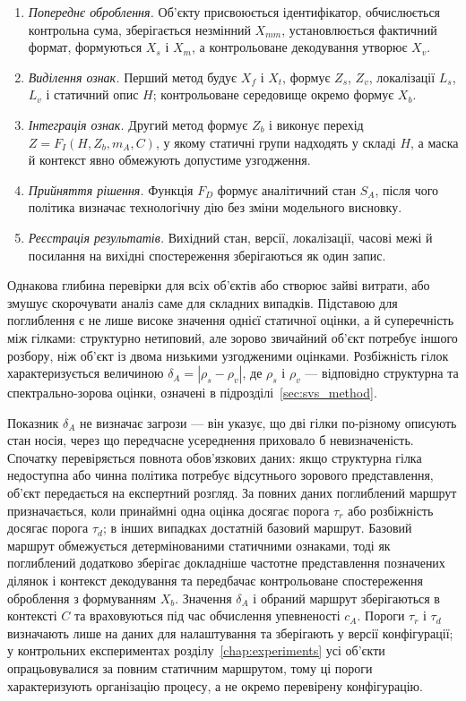 \begin{enumerate}
\item \textit{Попереднє оброблення.} Об’єкту присвоюється ідентифікатор, обчислюється контрольна сума, зберігається незмінний $X_{mm}$, установлюється фактичний формат, формуються $X_s$ і $X_m$, а контрольоване декодування утворює $X_v$.
\item \textit{Виділення ознак.} Перший метод будує $X_f$ і $X_t$, формує $Z_s$, $Z_v$, локалізації $L_s$, $L_v$ і статичний опис $H$; контрольоване середовище окремо формує $X_b$.
\item \textit{Інтеграція ознак.} Другий метод формує $Z_b$ і виконує перехід $Z=F_I(H,Z_b,m_A,C)$, у якому статичні групи надходять у складі $H$, а маска й контекст явно обмежують допустиме узгодження.
\item \textit{Прийняття рішення.} Функція $F_D$ формує аналітичний стан $S_A$, після чого політика визначає технологічну дію без зміни модельного висновку.
\item \textit{Реєстрація результатів.} Вихідний стан, версії, локалізації, часові межі й посилання на вихідні спостереження зберігаються як один запис.
\end{enumerate}

Однакова глибина перевірки для всіх об’єктів або створює зайві витрати, або змушує скорочувати аналіз саме для складних випадків. Підставою для поглиблення є не лише високе значення однієї статичної оцінки, а й суперечність між гілками: структурно нетиповий, але зорово звичайний об’єкт потребує іншого розбору, ніж об’єкт із двома низькими узгодженими оцінками. Розбіжність гілок характеризується величиною $\delta_A=|\rho_s-\rho_v|$, де $\rho_s$ і $\rho_v$ --- відповідно структурна та спектрально-зорова оцінки, означені в підрозділі~\ref{sec:svs_method}.

Показник $\delta_A$ не визначає загрози --- він указує, що дві гілки по-різному описують стан носія, через що передчасне усереднення приховало б невизначеність. Спочатку перевіряється повнота обов’язкових даних: якщо структурна гілка недоступна або чинна політика потребує відсутнього зорового представлення, об’єкт передається на експертний розгляд. За повних даних поглиблений маршрут призначається, коли принаймні одна оцінка досягає порога $\tau_r$ або розбіжність досягає порога $\tau_d$; в інших випадках достатній базовий маршрут. Базовий маршрут обмежується детермінованими статичними ознаками, тоді як поглиблений додатково зберігає докладніше частотне представлення позначених ділянок і контекст декодування та передбачає контрольоване спостереження оброблення з формуванням $X_b$. Значення $\delta_A$ і обраний маршрут зберігаються в контексті $C$ та враховуються під час обчислення упевненості $c_A$. Пороги $\tau_r$ і $\tau_d$ визначають лише на даних для налаштування та зберігають у версії конфігурації; у контрольних експериментах розділу~\ref{chap:experiments} усі об’єкти опрацьовувалися за повним статичним маршрутом, тому ці пороги характеризують організацію процесу, а не окремо перевірену конфігурацію.

